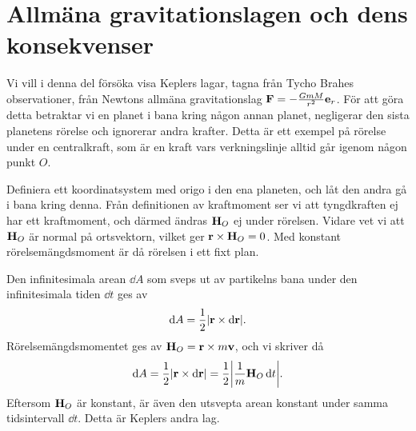 \section{Allmäna gravitationslagen och dens konsekvenser}

Vi vill i denna del försöka visa Keplers lagar, tagna från Tycho Brahes observationer, från Newtons allmäna gravitationslag $\vb{F} = -\frac{GmM}{r^2}\vb{e}_{r}$. För att göra detta betraktar vi en planet i bana kring någon annan planet, negligerar den sista planetens rörelse och ignorerar andra krafter. Detta är ett exempel på rörelse under en centralkraft, som är en kraft vars verkningslinje alltid går igenom någon punkt $O$.

Definiera ett koordinatsystem med origo i den ena planeten, och låt den andra gå i bana kring denna. Från definitionen av kraftmoment ser vi att tyngdkraften ej har ett kraftmoment, och därmed ändras $\vb{H}_{O}$ ej under rörelsen. Vidare vet vi att $\vb{H}_{O}$ är normal på ortsvektorn, vilket ger $\vb{r}\times\vb{H}_{O} = 0$. Med konstant rörelsemängdsmoment är då rörelsen i ett fixt plan.

Den infinitesimala arean $\dd{A}$ som sveps ut av partikelns bana under den infinitesimala tiden $\dd{t}$ ges av
\begin{align*}
	\dd{A} = \frac{1}{2}\abs{\vb{r}\times\dd{\vb{r}}}.
\end{align*}
Rörelsemängdsmomentet ges av $\vb{H}_{O} = \vb{r}\times m\vb{v}$, och vi skriver då
\begin{align*}
	\dd{A} = \frac{1}{2}\abs{\vb{r}\times\dd{\vb{r}}} = \frac{1}{2}\abs{\frac{1}{m}\vb{H}_{O}\dd{t}}.
\end{align*}
Eftersom $\vb{H}_{O}$ är konstant, är även den utsvepta arean konstant under samma tidsintervall $\dd{t}$. Detta är Keplers andra lag.

